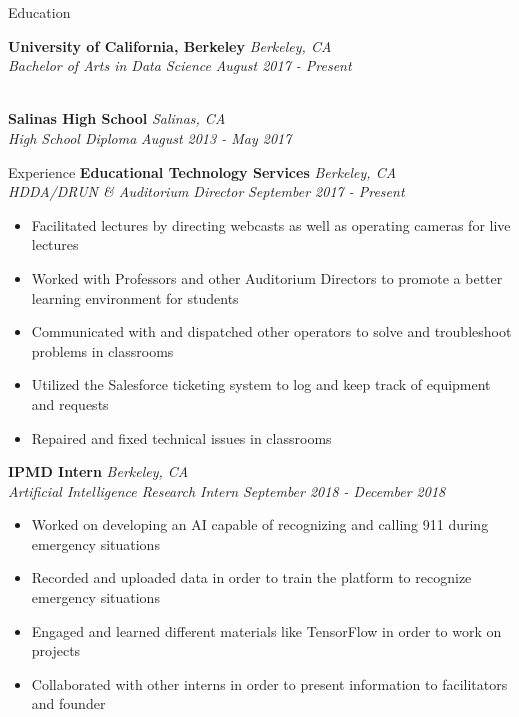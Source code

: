 \documentclass{resume}
\begin{document}
\begin{rSection}{Education}

{\bf University of California, Berkeley} \hfill {\em Berkeley, CA} 
\\ {\it Bachelor of Arts in Data Science} \hfill {\em August 2017 - Present}

\\ {\bf Salinas High School} \hfill {\em Salinas, CA} 
\\ {\it High School Diploma} \hfill {\em August 2013 - May 2017}

\end{rSection}

\begin{rSection}{Experience}
{\bf Educational Technology Services} \hfill {\em Berkeley, CA} 
\\{\it HDDA/DRUN & Auditorium Director} \hfill {\em September 2017 - Present}
\begin{itemize}
    \item Facilitated lectures by directing webcasts as well as operating cameras for live lectures
    \item Worked with Professors and other Auditorium Directors to promote a better learning environment for students
    \item Communicated with and dispatched other operators to solve and troubleshoot problems in classrooms
    \item Utilized the Salesforce ticketing system to log and keep track of equipment and requests
    \item Repaired and fixed technical issues in classrooms
\end{itemize}

{\bf IPMD Intern} \hfill {\em Berkeley, CA}
\\{\it Artificial Intelligence Research Intern} \hfill {\em September 2018 - December 2018}
\begin{itemize}
    \item Worked on developing an AI capable of recognizing and calling 911 during emergency situations
    \item Recorded and uploaded data in order to train the platform to recognize emergency situations
    \item Engaged and learned different materials like TensorFlow in order to work on projects
    \item Collaborated with other interns in order to present information to facilitators and founder
\end{itemize}

\end{rSection}
\end{document}
